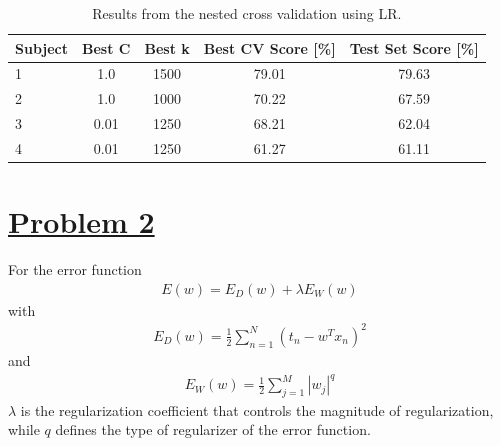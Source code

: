 \documentclass[11pt, a4paper]{article}
\begin{document}
\begin{table}[hbt!]
\centering
\caption{Results from the nested cross validation using LR.}
\begin{tabular}{||l||c|c|c|c||}
\hline
Subject & Best C & Best k & \multicolumn{1}{l|}{Best CV Score {[}\%{]}} & \multicolumn{1}{l||}{Test Set Score {[}\%{]}} \\ \hline \hline
1       & 1.0  & 1500   & 79.01                                       & 79.63                                        \\ \hline
2       & 1.0  & 1000   & 70.22                                       & 67.59                                        \\ \hline
3       & 0.01  & 1250   & 68.21                                       & 62.04                                        \\ \hline
4       & 0.01  & 1250   & 61.27                                       & 61.11                                        \\ \hline
\end{tabular}
\label{tab:cv_lr}
\end{table}

\break
\clearpage
\section*{\centering \underline{Problem 2}}

For the error function 
\begin{eqnarray}
E(w) = E_D(w) + \lambda E_W(w)
\label{eq:complete_err}
\end{eqnarray}
with
\begin{eqnarray}
E_D(w) = \frac{1}{2}\sum^N_{n=1} (t_n - w^Tx_n)^2
\label{eq:RSS}
\end{eqnarray}
and
\begin{eqnarray}
E_W(w) = \frac{1}{2}\sum^M_{j=1}|w_j|^q 
\label{eq:reg}
\end{eqnarray}
$\lambda $ is the regularization coefficient that controls the magnitude of regularization, while $q$ defines the type of regularizer of the error function. \newline
\end{document}

